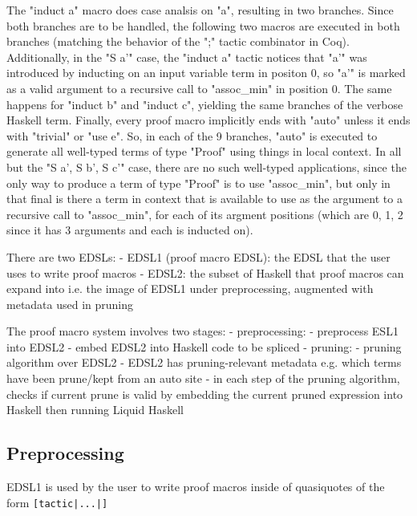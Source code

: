The "induct a" macro does case analsis on "a", resulting in two branches. Since both branches are to be handled, the following two macros are executed in both branches (matching the behavior of the ";" tactic combinator in Coq).
Additionally, in the "S a'" case, the "induct a" tactic notices that "a'" was introduced by inducting on an input variable term in positon 0, so "a'" is marked as a valid argument to a recursive call to "assoc\_min" in position 0.
The same happens for "induct b" and "induct c", yielding the same branches of the verbose Haskell term.
Finally, every proof macro implicitly ends with "auto" unless it ends with "trivial" or "use e".
So, in each of the 9 branches, "auto" is executed to generate all well-typed terms of type "Proof" using things in local context.
In all but the "S a', S b', S c'" case, there are no such well-typed applications, since the only way to produce a term of type "Proof" is to use "assoc\_min", but only in that final is there a term in context that is available to use as the argument to a recursive call to "assoc\_min", for each of its argment positions (which are 0, 1, 2 since it has 3 arguments and each is inducted on).


There are two EDSLs:
- EDSL1 (proof macro EDSL): the EDSL that the user uses to write proof macros
- EDSL2: the subset of Haskell that proof macros can expand into i.e. the image of EDSL1 under preprocessing, augmented with metadata used in pruning

The proof macro system involves two stages:
- preprocessing:
  - preprocess ESL1 into EDSL2
  - embed EDSL2 into Haskell code to be spliced
- pruning:
  - pruning algorithm over EDSL2 
    - EDSL2 has pruning-relevant metadata e.g. which terms have been prune/kept from an auto site
    - in each step of the pruning algorithm, checks if current prune is valid by embedding the current pruned expression into Haskell then running Liquid Haskell

\subsection{Preprocessing}

EDSL1 is used by the user to write proof macros inside of quasiquotes of the form \texttt{[tactic|...|]}

